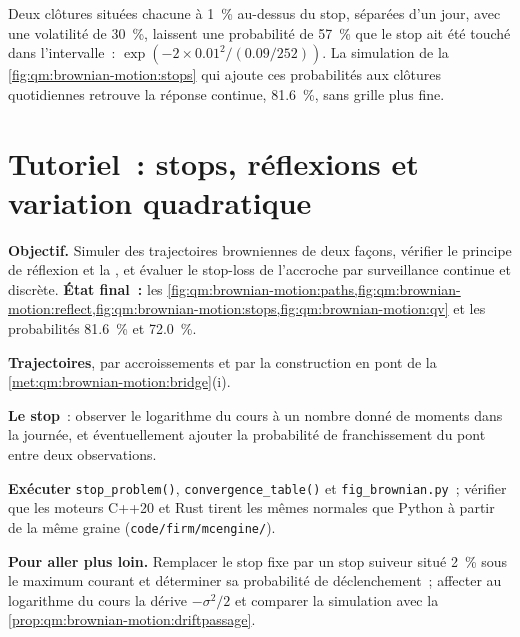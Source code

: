 Deux clôtures situées chacune à 1~\% au-dessus du stop, séparées d'un jour, avec une volatilité de 30~\%, laissent une probabilité de 57~\%
que le stop ait été touché dans l'intervalle~: $\exp(-2 \times 0.01^2/(0.09/252))$. La
simulation de la \cref{fig:qm:brownian-motion:stops} qui ajoute ces probabilités aux clôtures quotidiennes
retrouve la réponse continue, 81.6~\%, sans grille plus fine.

\section{Tutoriel~: stops, réflexions et variation quadratique}\label{tut:qm:brownian-motion:stops}

\begin{tutorial}
\textbf{Objectif.} Simuler des trajectoires browniennes de deux façons, vérifier le principe de réflexion et la
, et évaluer le stop-loss de l'accroche par surveillance continue et discrète.
\textbf{État final~:} les \cref{fig:qm:brownian-motion:paths,fig:qm:brownian-motion:reflect,fig:qm:brownian-motion:stops,fig:qm:brownian-motion:qv}
et les probabilités 81.6~\% et 72.0~\%.
\begin{tutsteps}
\item \textbf{Trajectoires}, par accroissements et par la construction en pont de la \cref{met:qm:brownian-motion:bridge}(i).
\label{lst:qm:brownian-motion:bridge}
\item \textbf{Le stop}~: observer le logarithme du cours à un nombre donné de moments dans la journée, et
éventuellement ajouter la probabilité de franchissement du pont entre deux observations.
\label{lst:qm:brownian-motion:touch}
\item \textbf{Exécuter} \texttt{stop\_problem()}, \texttt{convergence\_table()} et
\texttt{fig\_brownian.py}~; vérifier que les moteurs C++20 et Rust tirent les mêmes normales que
Python à partir de la même graine (\texttt{code/firm/mcengine/}).
\end{tutsteps}
\textbf{Pour aller plus loin.} Remplacer le stop fixe par un stop suiveur situé 2~\% sous le
maximum courant et déterminer sa probabilité de déclenchement~; affecter au logarithme du cours la dérive $-\sigma^2/2$ et
comparer la simulation avec la \cref{prop:qm:brownian-motion:driftpassage}.
\end{tutorial}

